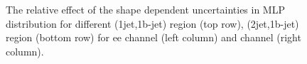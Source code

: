 \begin{figure}[ht]
\begin{center}
\begin{tabular}{ccc}
    \end{tabular}
    \caption{The relative effect of the shape dependent uncertainties in MLP distribution for different (1jet,1b-jet)  region (top row), (2jet,1b-jet) region (bottom row) for ee channel (left column) and \mumu channel (right column).
    \label{fig:uncert_shape}}
  \end{center}
\end{figure}


%






